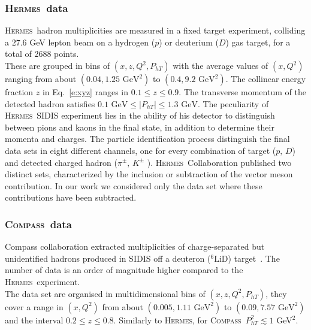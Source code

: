 \documentclass[aps,preprintnumbers,showpacs,nofootinbib,superscriptaddress,floatfix]{revtex4}
\newcommand{\hermes}{\textsc{Hermes}}
\newcommand{\compass}{\textsc{Compass}}
\newcommand{\Tperp}{T}
\begin{document}
\subsubsection{\hermes\ data}
\label{sss:hermes}

\hermes\ hadron multiplicities are measured in a fixed target experiment, colliding a $27.6$ GeV lepton beam on a hydrogen ($p$) or deuterium ($D$) gas target, for a total of 2688 points.\\
These are grouped in bins of $(x,z,Q^2,P_{hT})$ with the average values of $(x,Q^2)$ ranging from about $(0.04, 1.25\text{ GeV}^2)$ to $(0.4, 9.2\text{ GeV}^2)$. 
The collinear energy fraction $z$ in Eq.~\eqref{e:xyz} ranges in $0.1\leq z\leq 0.9$. The transverse momentum of the detected hadron satisfies $0.1 \text{ GeV} \leq \vert P_{hT} \vert \leq 1.3 \text{ GeV}$.
The peculiarity of \hermes\ SIDIS experiment lies in the ability of his detector to distinguish between pions and kaons in the final state, in addition to determine their momenta and charges.
The particle identification process distinguish the final data sets in eight different channels, one for every combination of target ($p,\,D$) and detected charged hadron ($\pi^\pm, \,  K^\pm$ ).
\hermes\ Collaboration published two distinct sets, characterized by the inclusion or subtraction of the vector meson contribution. In our work we considered only the data set where these contributions have been subtracted. \\


\subsubsection{\compass\ data}
\label{sss:compass}

Compass collaboration extracted multiplicities of charge-separated but unidentified hadrons produced in SIDIS off a deuteron ($^6\text{LiD}$) target~\cite{Adolph:2013stb}.  The number of data is an order of magnitude higher compared to the \hermes\ experiment. \\
The data set are organised in multidimensional bins of $(x,z,Q^2,P_{h\Tperp})$, they cover a range in $(x,Q^2)$ from about $(0.005, 1.11\text{ GeV}^2)$ to $(0.09, 7.57\text{ GeV}^2)$ and the interval $0.2 \leq z \leq 0.8$. Similarly to \hermes , for \compass\ $P_{h\Tperp}^2 \lesssim 1$ GeV$^2$. 
\end{document}
